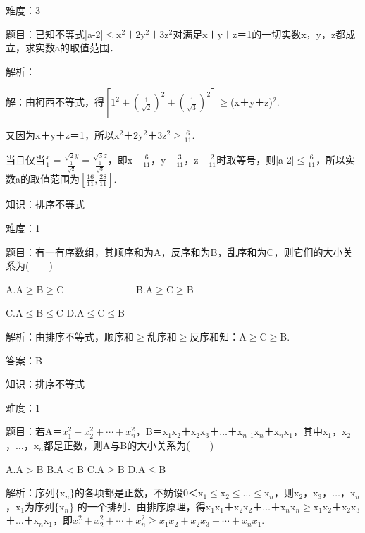 \documentclass{article} %
\begin{document}
 难度：3

 题目：已知不等式|a-2|$\mathrm{\le}$x${}^{2}$＋2y${}^{2}$＋3z${}^{2}$对满足x＋y＋z＝1的一切实数x，y，z都成立，求实数a的取值范围．

 解析：

 解：由柯西不等式，得$[1^2+(\frac{1}{\sqrt{2}})^2+(\frac{1}{\sqrt{3}})^2]\mathrm{\ge}$(x＋y＋z)${}^{2}$.

又因为x＋y＋z＝1，所以x${}^{2}$＋2y${}^{2}$＋3z${}^{2}$$\mathrm{\ge}\frac{6}{11}$.

当且仅当$\frac{x}{1}=\frac{\sqrt{2}y}{\frac{1}{\sqrt{2}}}=\frac{\sqrt{3}z}{\frac{1}{\sqrt{3}}}$，即x＝$\frac{6}{11}$，y＝$\frac{3}{11}$，z＝$\frac{2}{11}$时取等号，则|a-2|$\mathrm{\le}\frac{6}{11}$，所以实数a的取值范围为$[\frac{16}{11}, \frac{28}{11}]$.

 

 知识：排序不等式

 难度：1

 题目：有一有序数组，其顺序和为A，反序和为B，乱序和为C，则它们的大小关系为(　　)

A.A$\mathrm{\ge}$B$\mathrm{\ge}$C　　　　　　　  B.A$\mathrm{\ge}$C$\mathrm{\ge}$B

C.A$\mathrm{\le}$B$\mathrm{\le}$C  D.A$\mathrm{\le}$C$\mathrm{\le}$B

 解析：由排序不等式，顺序和$\mathrm{\ge}$乱序和$\mathrm{\ge}$反序和知：A$\mathrm{\ge}$C$\mathrm{\ge}$B.

 答案：B

 

 知识：排序不等式

 难度：1

 题目：若A＝$x_1^2+x_2^2+\cdots+x_n^2$，B＝x${}_{1}$x${}_{2}$＋x${}_{2}$x${}_{3}$＋{$\dots$}＋x${}_{n}$${}_{\textrm{-}}$${}_{1}$x${}_{n}$＋x${}_{n}$x${}_{1}$，其中x${}_{1}$，x${}_{2}$，{$\dots$}，x${}_{n}$都是正数，则A与B的大小关系为(　　)

A.A$\mathrm{>}$B  B.A$\mathrm{<}$B  C.A$\mathrm{\ge}$B  D.A$\mathrm{\le}$B

 解析：序列$\mathrm{\{}$x${}_{n}$$\mathrm{\}}$的各项都是正数，不妨设0＜x${}_{1}$$\mathrm{\le}$x${}_{2}$$\mathrm{\le}${$\dots$}$\mathrm{\le}$x${}_{n}$，则x${}_{2}$，x${}_{3}$，{$\dots$}，x${}_{n}$，x${}_{1}$为序列$\mathrm{\{}$x${}_{n}$$\mathrm{\}}$ 的一个排列．由排序原理，得x${}_{1}$x${}_{1}$＋x${}_{2}$x${}_{2}$＋{$\dots$}＋x${}_{n}$x${}_{n}$$\mathrm{\ge}$x${}_{1}$x${}_{2}$＋x${}_{2}$x${}_{3}$＋{$\dots$}＋x${}_{n}$x${}_{1}$，即$x_1^2+x_2^2+\cdots+x_n^2\ge x_1x_2+x_2x_3+\cdots+x_nx_1$.
\end{document}
